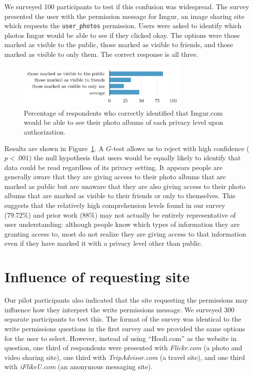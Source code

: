 \documentclass[twoside,letterpaper]{soups-poster}
\begin{document}
We surveyed 100 participants to test if this confusion was widespread. The survey presented the user with the permission message for Imgur, an image sharing site which requests the \texttt{user\_photos} permission. Users were asked to identify which photos Imgur would be able to see if they clicked okay. The options were those marked as visible to the public, those marked as visible to friends, and those marked as visible to only them. The correct response is all three.

\begin{figure}[b!]
  \centering
  \includegraphics[width=8.5cm]{privacy_percents_cosn}
  \caption{Percentage of respondents who correctly identified that Imgur.com would be able to see their photo albums of each privacy level upon authorization.}
  \label{figure:privacypercents}
\end{figure}


Results are shown in Figure~\ref{figure:privacypercents}. A $G$-test allows us to reject with high confidence ($p < .001$) the null hypothesis that users would be equally likely to identify that data could be read regardless of its privacy setting.
It appears people are generally aware that they are giving access to their photo albums that are marked as public but are unaware that they are also giving access to their photo albums that are marked as visible to their friends or only to themselves.
This suggests that the relatively high comprehension levels found in our survey (79.72\%) and prior work (88\%) \cite{egelman} may not actually be entirely representative of user understanding: although people know which types of information they are granting access to, most do not realize they are giving access to that information even if they have marked it with a privacy level other than public.


\section{Influence of requesting site}

Our pilot participants also indicated that the site requesting the permissions may influence how they interpret the write permissions message. 
We surveyed 300 separate participants to test this. The format of the survey was identical to the write permissions questions in the first survey and we provided the same options for the user to select. However, instead of using ``Hooli.com'' as the website in question, one third of respondents were presented with \emph{Flickr.com} (a photo and video sharing site), one third with \emph{TripAdvisor.com} (a travel site), and one third with \emph{iFlikeU.com} (an anonymous messaging site).
\end{document}
